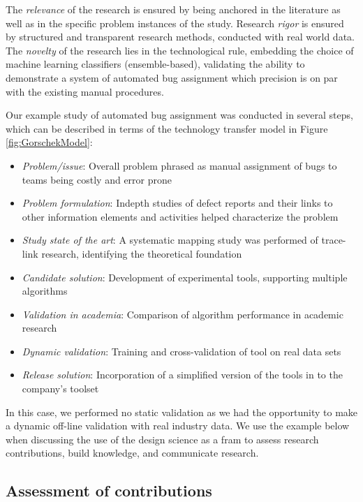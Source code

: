 \documentclass[graybox]{svmult}
\begin{document}
The \emph{relevance} of the research is ensured by being anchored in the literature as well as in the specific problem instances of the study. Research \emph{rigor} is ensured by structured and transparent research methods, conducted with real world data. The \emph{novelty} of the research lies in the technological rule, embedding the choice of machine learning classifiers (ensemble-based), validating the ability to demonstrate a system of automated bug assignment which precision is on par with the existing manual procedures.

Our example study of automated bug assignment was conducted in several steps, which can be described in terms of the technology transfer model in Figure \ref{fig:GorschekModel}:
\begin{itemize}
\item \emph{Problem/issue}: Overall problem phrased as manual assignment of bugs to teams being costly and error prone
\item \emph{Problem formulation}: Indepth studies of defect reports and their links to other information elements and activities helped characterize the problem
\item \emph{Study state of the art}: A systematic mapping study was performed of trace-link research, identifying the theoretical foundation \cite{Borg2013EMSE}
\item \emph{Candidate solution}: Development of experimental tools, supporting multiple algorithms
\item \emph{Validation in academia}: Comparison of algorithm performance in academic research \cite{BorgESEM13}
\item \emph{Dynamic validation}: Training and cross-validation of tool on real data sets \cite{JonssonBug15}
\item \emph{Release solution}: Incorporation of a simplified version of the tools in to the company's toolset
\end{itemize} 

In this case, we performed no static validation as we had the opportunity to make a dynamic off-line validation with real industry data. We use the example below when discussing the use of the design science as a fram to assess research contributions, build knowledge, and communicate research.



\subsection{Assessment of contributions}
\label{sec:assessment}
\end{document}
